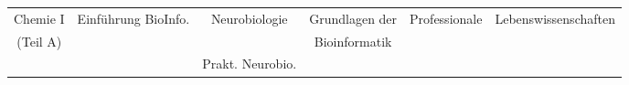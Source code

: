 \begin{table}[htbp]
{\begin{tabular}{cccccc}
			\multicolumn{1}{|c|}{Chemie I}      & \multicolumn{1}{c|}{Einführung BioInfo.} & \multicolumn{1}{c|}{Neurobiologie}    & \multicolumn{1}{c|}{Grundlagen der} & \multicolumn{1}{c|}{Professionale}     & \multicolumn{1}{c|}{Lebenswissenschaften} \\ \cline{2-2} \cline{6-6} 
			\multicolumn{1}{|c|}{(Teil A)}      & \multicolumn{1}{c|}{}                     & \multicolumn{1}{c|}{}                 & \multicolumn{1}{c|}{Bioinformatik}  & \multicolumn{1}{c|}{}                  &                                           \\ \cline{1-1} \cline{3-3} \cline{5-5}
			                                    & \multicolumn{1}{c|}{}                     & \multicolumn{1}{c|}{Prakt. Neurobio.} & \multicolumn{1}{c|}{}               &                                        &                                           \\ \cline{3-4}
		\end{tabular}}
\end{table}
